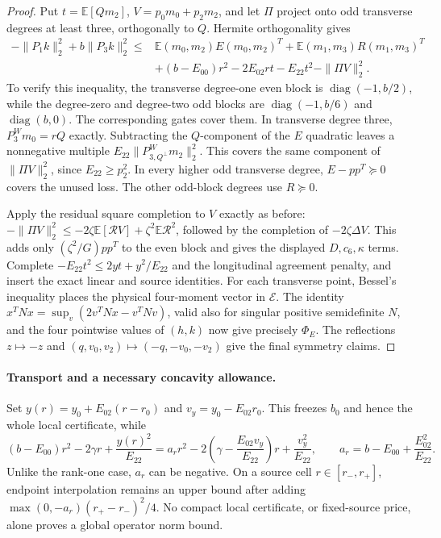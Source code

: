 \documentclass[11pt]{article}
\begin{document}
\begin{proof}
Put $t=\mathbb E[Qm_2]$, $V=p_0m_0+p_2m_2$, and let $\Pi$
project onto odd transverse degrees at least three, orthogonally to
$Q$.  Hermite orthogonality gives
\begin{align*}
 -\|P_1k\|_2^2+b\|P_3k\|_2^2\leq{}&
 \mathbb E(m_0,m_2)E(m_0,m_2)^T+
 \mathbb E(m_1,m_3)R(m_1,m_3)^T\\
 &+(b-E_{00})r^2-2E_{02}rt-E_{22}t^2
 -\|\Pi V\|_2^2.
\end{align*}
To verify this inequality, the transverse degree-one even block is
$\operatorname{diag}(-1,b/2)$, while the degree-zero and degree-two
odd blocks are $\operatorname{diag}(-1,b/6)$ and
$\operatorname{diag}(b,0)$.  The corresponding gates cover them.
In transverse degree three, $P_3^Wm_0=rQ$ exactly.  Subtracting the
$Q$-component of the $E$ quadratic leaves a nonnegative multiple
$E_{22}\|P_{3,Q^\perp}^Wm_2\|_2^2$.  This covers the same component
of $\|\Pi V\|_2^2$, since $E_{22}\geq p_2^2$.
In every higher odd transverse degree, $E-pp^T\succeq0$ covers
the unused loss.  The other odd-block degrees use $R\succeq0$.

Apply the residual square completion to $V$ exactly as before:
$-\|\Pi V\|_2^2\leq-2\zeta\mathbb E[\mathcal RV]
+\zeta^2\mathbb E\mathcal R^2$, followed by the completion of
$-2\zeta\Delta V$.  This adds only $(\zeta^2/G)pp^T$ to the
even block and gives the displayed $D,c_6,\kappa$ terms.
Complete $-E_{22}t^2\leq2yt+y^2/E_{22}$ and the longitudinal
agreement penalty, and insert the exact linear and source identities.
For each transverse point, Bessel's inequality places the physical
four-moment vector in $\mathcal E$.
The identity $x^TNx=\sup_v(2v^TNx-v^TNv)$, valid also for
singular positive semidefinite $N$, and the four pointwise values of
$(h,k)$ now give precisely $\Phi_E$.
The reflections $z\mapsto-z$ and
$(q,v_0,v_2)\mapsto(-q,-v_0,-v_2)$ give the final symmetry claims.
\end{proof}

\paragraph{Transport and a necessary concavity allowance.}
Set $y(r)=y_0+E_{02}(r-r_0)$ and $v_y=y_0-E_{02}r_0$.
This freezes $b_0$ and hence the whole local certificate, while
\[
 (b-E_{00})r^2-2\gamma r+\frac{y(r)^2}{E_{22}}
 =a_r r^2-2\left(\gamma-\frac{E_{02}v_y}{E_{22}}\right)r
                +\frac{v_y^2}{E_{22}},\qquad
 a_r=b-E_{00}+\frac{E_{02}^2}{E_{22}}.
\]
Unlike the rank-one case, $a_r$ can be negative.  On a source cell
$r\in[r_-,r_+]$, endpoint interpolation remains an upper bound after
adding $\max(0,-a_r)(r_+-r_-)^2/4$.
No compact local certificate, or fixed-source price, alone proves a
global operator norm bound.
\end{document}
